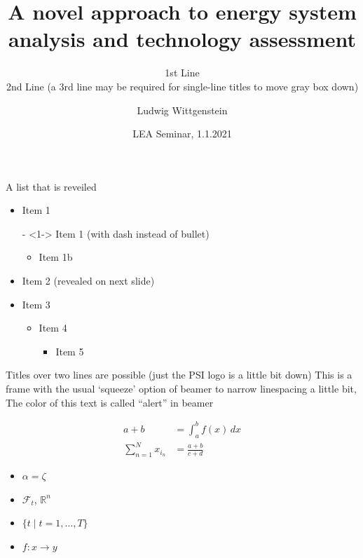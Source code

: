 \documentclass[aspectratio=43]{beamer}
\begin{document}
\title{A novel approach to energy system analysis and technology assessment}

\author[L. Wittgenstein]{Ludwig Wittgenstein}


\subtitle{1st Line\\2nd Line (a 3rd line may be required for single-line titles to move gray box down)}

\date{LEA Seminar, 1.1.2021} %

\begin{frame}[plain] %
  \titlepage
\end{frame}


\begin{frame}{A list that is reveiled}  
  \begin{itemize}
  \item<1-> Item 1
  \item[-]<1->  Item 1 (with dash instead of bullet)
    \begin{itemize}
    \item<1-> Item 1b
    \end{itemize}
  \item<2->  Item 2 (revealed on next slide)
  \item<3-> Item 3
    \begin{itemize}
    \item<3-> Item 4
      \begin{itemize}
      \item<3-> Item 5
      \end{itemize}
    \end{itemize}
  \end{itemize}
 \vspace*{\fill} %
\end{frame}



\begin{frame}[squeeze]{Titles over two lines are possible (just the PSI logo is a little bit down)}
  \alert{This is a frame with the usual `squeeze' option of beamer to narrow linespacing a little bit, The color of this text is called ``alert'' in beamer}
  
  \begin{align*}
    a + b  & = \int_a^b f(x)\,dx \\
    \sum_{n=1}^N x_{i_n} &= \frac{a+b}{c+d} 
  \end{align*}
  \begin{itemize}
  \item  $\alpha = \zeta$ 
  \item $\mathcal{F}_t$, $\mathbb{R}^n$
  \item $\{t \mid t=1,\dots,T\}$
  \item $f\colon x\to y$
  \end{itemize}  
\end{frame}
\end{document}
